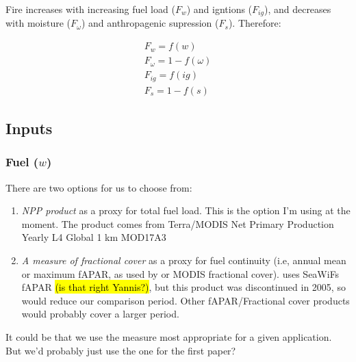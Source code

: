 Fire increases with increasing fuel load ($F_w$) and igntions ($F_{ig}$), and decreases with moisture ($F_{\omega}$) and anthropagenic supression ($F_s$). Therefore:

\begin{equation}
    \begin{split}
        F_{w} = f(w) \\
        F_{\omega} = 1 - f(\omega) \\
        F_{ig} = f(ig) \\
        F_{s} = 1- f(s)
    \end{split}
    \label{equ:LimFIRE.x}
\end{equation}



\subsection{Inputs}
\begin{shaded}
\subsubsection{Fuel ($w$)}
There are two options for us to choose from:
\begin{enumerate}
    \item \textit{NPP product} as a proxy for total fuel load. This is the option I'm using at the moment. The product comes from Terra/MODIS Net Primary Production Yearly L4 Global 1 km MOD17A3 \citep{nasa2012terra}
    \item \textit{A measure of fractional cover} as a proxy for fuel continuity (i.e, annual mean or maximum fAPAR, as used by \citet{knorr2014impact,knorr2016climate} or MODIS fractional cover). \citet{bistinas2014causal} uses SeaWiFs fAPAR \hl{(is that right Yannis?)}, but this product was discontinued in 2005, so would reduce our comparison period. Other fAPAR/Fractional cover products would probably cover a larger period.
\end{enumerate}

It could be that we use the measure most appropriate for a given application. But we'd probably just use the one for the first paper?
\end{shaded}


